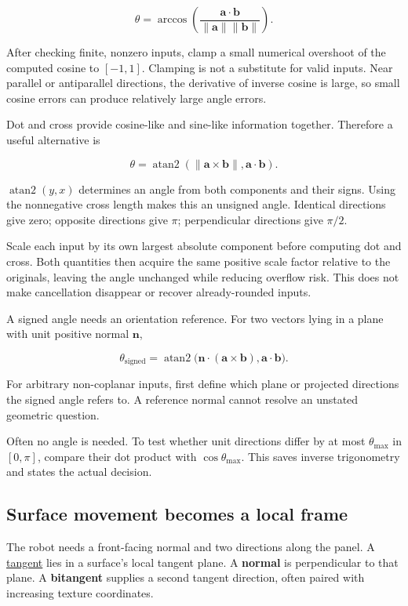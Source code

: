 \[
\theta=\arccos\left(
\frac{\mathbf a\cdot\mathbf b}{\|\mathbf a\|\|\mathbf b\|}
\right).
\]

After checking finite, nonzero inputs, clamp a small numerical overshoot of the computed cosine to \([-1,1]\). Clamping is not a substitute for valid inputs. Near parallel or antiparallel directions, the derivative of inverse cosine is large, so small cosine errors can produce relatively large angle errors.

Dot and cross provide cosine-like and sine-like information together. Therefore a useful alternative is

\[
\theta=\operatorname{atan2}
\left(\|\mathbf a\times\mathbf b\|,\mathbf a\cdot\mathbf b\right).
\]

\(\operatorname{atan2}(y,x)\) determines an angle from both components and their signs. Using the nonnegative cross length makes this an unsigned angle. Identical directions give zero; opposite directions give \(\pi\); perpendicular directions give \(\pi/2\).

Scale each input by its own largest absolute component before computing dot and cross. Both quantities then acquire the same positive scale factor relative to the originals, leaving the angle unchanged while reducing overflow risk. This does not make cancellation disappear or recover already-rounded inputs.

A signed angle needs an orientation reference. For two vectors lying in a plane with unit positive normal \(\mathbf n\),

\[
\theta_{\mathrm{signed}}=
\operatorname{atan2}\big(\mathbf n\cdot(\mathbf a\times\mathbf b),
\mathbf a\cdot\mathbf b\big).
\]

For arbitrary non-coplanar inputs, first define which plane or projected directions the signed angle refers to. A reference normal cannot resolve an unstated geometric question.

Often no angle is needed. To test whether unit directions differ by at most \(\theta_{\max}\) in \([0,\pi]\), compare their dot product with \(\cos\theta_{\max}\). This saves inverse trigonometry and states the actual decision.

\subsection{Surface movement becomes a local frame}\label{surface-movement-becomes-a-local-frame}

The robot needs a front-facing normal and two directions along the panel. A \hyperref[01-foundations-i-ch017]{tangent} lies in a surface's local tangent plane. A \textbf{normal} is perpendicular to that plane. A \textbf{bitangent} supplies a second tangent direction, often paired with increasing texture coordinates.

